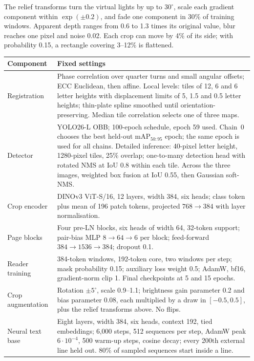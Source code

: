 \documentclass[11pt]{article}
\begin{document}
The relief transforms turn the virtual lights by up to $30^\circ$, scale each gradient component
within $\exp(\pm0.2)$, and fade one component in 30\% of training windows. Apparent depth ranges from
0.6 to 1.3 times its original value, blur reaches one pixel and noise 0.02. Each crop can move by
4\% of its side; with probability 0.15, a rectangle covering 3--12\% is flattened.

\begin{table}[htbp]
\centering\small
\begin{tabular}{@{}lp{}@{}}
\toprule
Component & Fixed settings \\
\midrule
Registration & Phase correlation over quarter turns and small angular offsets; ECC Euclidean, then
affine. Local levels: tiles of 12, 6 and 6 letter heights with displacement limits of 5, 1.5 and 0.5
letter heights; thin-plate spline smoothed until orientation-preserving. Median tile correlation selects
one of three maps. \\
Detector & YOLO26-L OBB; 100-epoch schedule, epoch 59 used. Chain~0 chooses the best
held-out mAP$_{50:95}$ epoch; the same epoch is used for all chains. Detailed inference: 40-pixel letter
height, 1280-pixel tiles, 25\% overlap; one-to-many detection head with rotated NMS at IoU 0.8 within
each tile. Across the three images, weighted box fusion at IoU 0.55, then Gaussian soft-NMS. \\
Crop encoder & DINOv3 ViT-S/16, 12 layers, width 384, six heads; class token plus mean of 196 patch
tokens, projected $768\to384$ with layer normalisation. \\
Page blocks & Four pre-LN blocks, six heads of width 64, 32-token support; pair-bias MLP
$8\to64\to6$ per block; feed-forward $384\to1536\to384$; dropout 0.1. \\
Reader training & 384-token windows, 192-token core, two windows per step; mask probability 0.15;
auxiliary loss weight 0.5; AdamW, bf16, gradient-norm clip 1. Final checkpoints at 5 and 15 epochs. \\
Crop augmentation & Rotation $\pm5^\circ$, scale 0.9--1.1; brightness gain parameter 0.2 and bias
parameter 0.08, each multiplied by a draw in $[-0.5,0.5]$, plus the relief transforms above. No flips. \\
Neural text base & Eight layers, width 384, six heads, context 192, tied embeddings; 6,000 steps,
512 sequences per step, AdamW peak $6\cdot10^{-4}$, 500 warm-up steps, cosine decay; every 200th
external line held out. 80\% of sampled sequences start inside a line. \\

\end{tabular}
\end{table}
\end{document}
